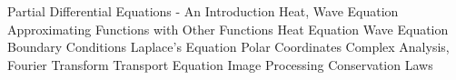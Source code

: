 \documentclass{article}
\begin{document}
\maketitle

\newpage

\tableofcontents
%
\newpage
%
{Partial Differential Equations - An Introduction}
{Heat, Wave Equation}
{Approximating Functions with Other Functions}
{Heat Equation}
{Wave Equation}
{Boundary Conditions}
{Laplace's Equation}
{Polar Coordinates}
{Complex Analysis, Fourier Transform}
{Transport Equation}
{Image Processing}
{Conservation Laws}
\end{document}
